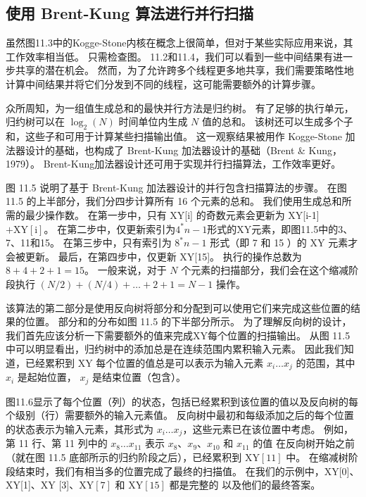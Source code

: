 \subsection{使用 Brent-Kung 算法进行并行扫描}
虽然图11.3中的Kogge-Stone内核在概念上很简单，但对于某些实际应用来说，其工作效率相当低。 只需检查图。 11.2和11.4，我们可以看到一些中间结果有进一步共享的潜在机会。 然而，为了允许跨多个线程更多地共享，我们需要策略性地计算中间结果并将它们分发到不同的线程，这可能需要额外的计算步骤。

众所周知，为一组值生成总和的最快并行方法是归约树。 有了足够的执行单元，归约树可以在 $\log_{2}(N)$ 时间单位内生成 $N$ 值的总和。 该树还可以生成多个子和，这些子和可用于计算某些扫描输出值。 这一观察结果被用作 Kogge-Stone 加法器设计的基础，也构成了 Brent-Kung 加法器设计的基础（Brent \& Kung，1979）。 Brent-Kung加法器设计还可用于实现并行扫描算法，工作效率更好。

图 11.5 说明了基于 Brent-Kung 加法器设计的并行包含扫描算法的步骤。 在图 11.5 的上半部分，我们分四步计算所有 16 个元素的总和。 我们使用生成总和所需的最少操作数。 在第一步中，只有 XY[i] 的奇数元素会更新为 XY[i-1] $+\mathrm{XY}[\mathrm{i}]$。 在第二步中，仅更新索引为$4^{*} n-1$形式的XY元素，即图11.5中的3、7、11和15。 在第三步中，只有索引为 $8^{*} n-1$ 形式（即 7 和 15 ）的 XY 元素才会被更新。 最后，在第四步中，仅更新 XY[15]。 执行的操作总数为$8+4+2+1=15$。 一般来说，对于 $N$ 个元素的扫描部分，我们会在这个缩减阶段执行 $(N / 2)+(N / 4)+\ldots+2+1=N-1$ 操作。

该算法的第二部分是使用反向树将部分和分配到可以使用它们来完成这些位置的结果的位置。 部分和的分布如图 11.5 的下半部分所示。 为了理解反向树的设计，我们首先应该分析一下需要额外的值来完成XY每个位置的扫描输出。 从图 11.5 中可以明显看出，归约树中的添加总是在连续范围内累积输入元素。 因此我们知道，已经累积到 XY 每个位置的值总是可以表示为输入元素 $x_{i} \ldots x_{j}$ 的范围，其中 $x_{i}$ 是起始位置， $x_{j}$ 是结束位置（包含）。

图11.6显示了每个位置（列）的状态，包括已经累积到该位置的值以及反向树的每个级别（行）需要额外的输入元素值。 反向树中最初和每级添加之后的每个位置的状态表示为输入元素，其形式为 $x_{i} \ldots x_{j}$，这些元素已在该位置中考虑。 例如，第 11 行、第 11 列中的 $x_{8} \ldots x_{11}$ 表示 $x_{8}、x_{9}、x_{10}$ 和 $x_{11}$ 的值 在反向树开始之前（就在图 11.5 底部所示的归约阶段之后），已经累积到 $\mathrm{XY}[11]$ 中。 在缩减树阶段结束时，我们有相当多的位置完成了最终的扫描值。 在我们的示例中，XY[0]、XY[1]、$\mathrm{XY}$ [3]、$\mathrm{XY}[7]$ 和 $\mathrm{XY}[15]$ 都是完整的 以及他们的最终答案。

